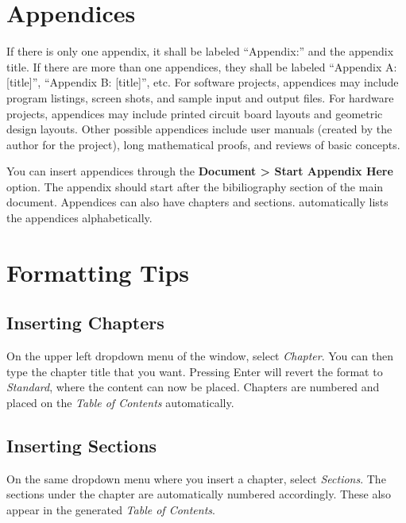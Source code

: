 \chapter{Appendices}

If there is only one appendix, it shall be labeled \textquotedblleft Appendix:\textquotedblright{}
and the appendix title. If there are more than one appendices, they
shall be labeled \textquotedblleft Appendix A: {[}title{]}\textquotedblright ,
\textquotedblleft Appendix B: {[}title{]}\textquotedblright , etc.
For software projects, appendices may include program listings, screen
shots, and sample input and output files. For hardware projects, appendices
may include printed circuit board layouts and geometric design layouts.
Other possible appendices include user manuals (created by the author
for the project), long mathematical proofs, and reviews of basic concepts.

You can insert appendices through the \textbf{Document \textgreater{}
Start Appendix Here} option. The appendix should start after the bibiliography
section of the main document. Appendices can also have chapters and
sections. \LyX{} automatically lists the appendices alphabetically.

\cleardoublepage{}

\chapter{Formatting Tips}

\section{Inserting Chapters}

On the upper left dropdown menu of the \LyX{} window, select \textit{Chapter}.
You can then type the chapter title that you want. Pressing Enter
will revert the format to \textit{Standard}, where the content can
now be placed. Chapters are numbered and placed on the \textit{Table
of Contents} automatically.

\section{Inserting Sections}

On the same dropdown menu where you insert a chapter, select \textit{Sections}.
The sections under the chapter are automatically numbered accordingly.
These also appear in the generated \textit{Table of Contents}.

